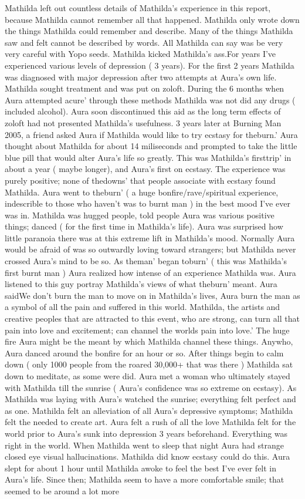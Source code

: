 \documentclass[12pt]{book}
\begin{document}
Mathilda left out countless details of Mathilda's experience in this report, because Mathilda cannot remember all that happened. Mathilda only wrote down the things Mathilda could remember and describe. Many of the things Mathilda saw and felt cannot be described by words. All Mathilda can say was be very very careful with Yopo seeds. Mathilda kicked Mathilda's ass.For years I've experienced various levels of depression ( 3 years). For the first 2 years Mathilda was diagnosed with major depression after two attempts at Aura's own life. Mathilda sought treatment and was put on zoloft. During the 6 months when Aura attempted acure' through these methods Mathilda was not did any drugs ( included alcohol). Aura soon discontinued this aid as the long term effects of zoloft had not presented Mathilda's usefulness. 3 years later at Burning Man 2005, a friend asked Aura if Mathilda would like to try ecstasy for theburn.' Aura thought about Mathilda for about 14 miliseconds and prompted to take the little blue pill that would alter Aura's life so greatly. This was Mathilda's firsttrip' in about a year ( maybe longer), and Aura's first on ecstasy. The experience was purely positive; none of thedowns' that people associate with ecstasy found Mathilda. Aura went to theburn' ( a huge bonfire/rave/spiritual experience, indescrible to those who haven't was to burnt man ) in the best mood I've ever was in. Mathilda was hugged people, told people Aura was various positive things; danced ( for the first time in Mathilda's life). Aura was surprised how little paranoia there was at this extreme lift in Mathilda's mood. Normally Aura would be afraid of was so outwardly loving toward strangers; but Mathilda never crossed Aura's mind to be so. As theman' began toburn' ( this was Mathilda's first burnt man ) Aura realized how intense of an experience Mathilda was. Aura listened to this guy portray Mathilda's views of what theburn' meant. Aura saidWe don't burn the man to move on in Mathilda's lives, Aura burn the man as a symbol of all the pain and suffered in this world. Mathilda, the artists and creative peoples that are attracted to this event, who are strong, can turn all that pain into love and excitement; can channel the worlds pain into love.' The huge fire Aura might be the meant by which Mathilda channel these things. Anywho, Aura danced around the bonfire for an hour or so. After things begin to calm down ( only 1000 people from the roared 30,000+ that was there ) Mathilda sat down to meditate, as some were did. Aura met a woman who ultimately stayed with Mathilda till the sunrise ( Aura's confidence was so extreme on ecstasy). As Mathilda was laying with Aura's watched the sunrise; everything felt perfect and as one. Mathilda felt an alleviation of all Aura's depressive symptoms; Mathilda felt the needed to create art. Aura felt a rush of all the love Mathilda felt for the world prior to Aura's sunk into depression 3 years beforehand. Everything was right in the world. When Mathilda went to sleep that night Aura had strange closed eye visual hallucinations. Mathilda did know ecstasy could do this. Aura slept for about 1 hour until Mathilda awoke to feel the best I've ever felt in Aura's life. Since then; Mathilda seem to have a more comfortable smile; that seemed to be around a lot more 
\end{document}
